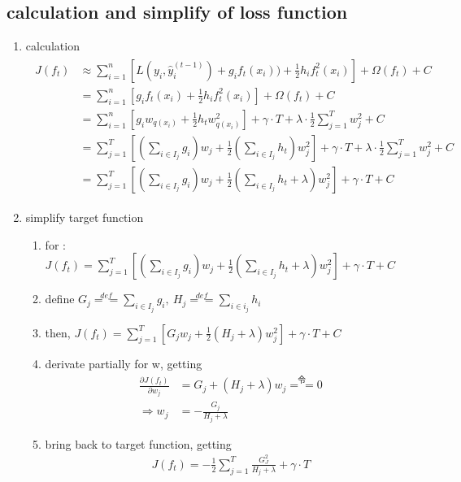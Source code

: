 \documentclass[12pt]{ctexart}%
\begin{document}
		\subsection{\quad calculation and simplify of loss function}
			\begin{enumerate}
				\item calculation
					\begin{align}
						\begin{split}
							J(f_t) &\approx \sum_{i=1}^{n} \left[ L(y_i, \hat{y}_i^{(t-1)}) + g_i f_t(x_i)) + \frac{1}{2} h_i f_t^2(x_i)\right] + \Omega(f_t) + C\\
							&= \sum_{i=1}^{n} \left[ g_i f_t(x_i) + \frac{1}{2} h_i f_t^2(x_i)\right] + \Omega(f_t) + C\\
							&= \sum_{i=1}^{n} \left[ g_i w_{q(x_i)} + \frac{1}{2}h_t w_{q(x_i)}^2\right] + \gamma\cdot T + \lambda\cdot \frac{1}{2}\sum_{j=1}^{T}w_j^2 + C\\
							&= \sum_{j=1}^{T} \left[ \left( \sum_{i\in I_j}g_i \right) w_{j} + \frac{1}{2} \left( \sum_{i\in I_j}h_t \right)  w_{j}^2\right] + \gamma\cdot T + \lambda\cdot \frac{1}{2}\sum_{j=1}^{T}w_j^2 + C\\
							&= \sum_{j=1}^{T} \left[ \left( \sum_{i\in I_j}g_i \right) w_{j} + \frac{1}{2} \left( \sum_{i\in I_j}h_t + \lambda \right)  w_{j}^2\right] + \gamma\cdot T + C
						\end{split}
					\end{align}
					
				\item simplify target function
					\begin{enumerate}
						\item for : $J(f_t) = \sum\limits_{j=1}^{T} \left[ \left( \sum\limits_{i\in I_j}g_i \right) w_{j} + \frac{1}{2} \left( \sum\limits_{i\in I_j}h_t + \lambda \right)  w_{j}^2\right] + \gamma\cdot T + C$
						
						\item define $G_j \overset{def}{==} \sum\limits_{i\in I_j} g_i, \ H_j \overset{def}{==} \sum\limits_{i\in i_j} h_i$
						
						\item then, $J(f_t) = \sum\limits_{j=1}^{T} \left[ G_j w_{j} + \frac{1}{2} ( H_j + \lambda )  w_{j}^2\right] + \gamma\cdot T + C$
						
						\item derivate partially for w, getting
							\begin{align}
								\frac{\partial J(f_t)}{\partial w_j} &= G_j +(H_j + \lambda)w_j \overset{\text{令}}{==} 0\\
								\Rightarrow w_j &= -\frac{G_j}{H_j + \lambda}
							\end{align}
							
						\item bring back to target function, getting
							\begin{align}
								J(f_t) = -\frac{1}{2} \sum_{j=1}^{T} \frac{G_J^2}{H_j + \lambda} + \gamma \cdot T
							\end{align}
					\end{enumerate}
			\end{enumerate}
		
\end{document}

